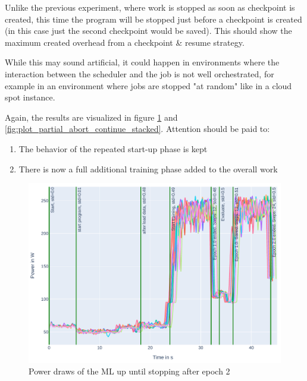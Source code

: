 Unlike the previous experiment, where work is stopped as soon as checkpoint is created, this time the program will be stopped just before a checkpoint is created (in this case just the second checkpoint would be saved). 
This should show the maximum created overhead from a checkpoint \& resume strategy. 

While this may sound artificial, it could happen in environments where the interaction between the scheduler and the job is not well orchestrated, for example in an environment where jobs are stopped "at random" like in a cloud spot instance.

Again, the results are visualized in figure \ref{fig:plot_partial_abort_stacked} and \ref{fig:plot_partial_abort_continue_stacked}. Attention should be paid to:

\begin{enumerate}
    \item The behavior of the repeated start-up phase is kept
    \item There is now a full additional training phase added to the overall work
\end{enumerate}

\begin{figure}
    \includegraphics[width=\linewidth]{power-measurements/stacked_plots/roberta_stop_without_saving.pdf}
    \caption{Power draws of the ML up until stopping after epoch 2}
    \label{fig:plot_partial_abort_stacked}
\end{figure}

